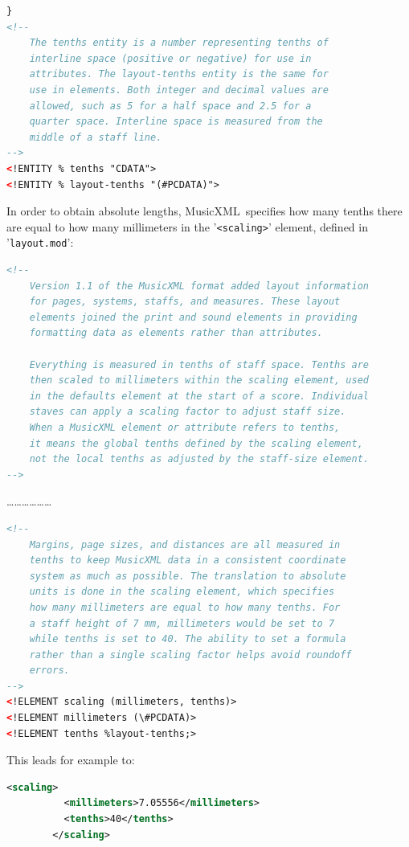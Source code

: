 \documentclass[12pt,a4paper]{article}
\newcommand{\mxml}{MusicXML}
\begin{document}
\begin{lstlisting}[language=XML]
}
<!--
	The tenths entity is a number representing tenths of
	interline space (positive or negative) for use in
	attributes. The layout-tenths entity is the same for
	use in elements. Both integer and decimal values are 
	allowed, such as 5 for a half space and 2.5 for a 
	quarter space. Interline space is measured from the
	middle of a staff line.
-->
<!ENTITY % tenths "CDATA">
<!ENTITY % layout-tenths "(#PCDATA)">
\end{lstlisting}

In order to obtain absolute lengths, \mxml\ specifies how many tenths there are equal to how many millimeters in the {'\tt <scaling>}' element, defined in {'\tt layout.mod}':

\begin{lstlisting}[language=XML]
<!--
	Version 1.1 of the MusicXML format added layout information
	for pages, systems, staffs, and measures. These layout
	elements joined the print and sound elements in providing
	formatting data as elements rather than attributes.

	Everything is measured in tenths of staff space. Tenths are
	then scaled to millimeters within the scaling element, used
	in the defaults element at the start of a score. Individual
	staves can apply a scaling factor to adjust staff size.
	When a MusicXML element or attribute refers to tenths,
	it means the global tenths defined by the scaling element,
	not the local tenths as adjusted by the staff-size element.
-->
\end{lstlisting}
\dots \dots \dots \dots \dots \dots
\begin{lstlisting}[language=XML]
<!--
	Margins, page sizes, and distances are all measured in
	tenths to keep MusicXML data in a consistent coordinate
	system as much as possible. The translation to absolute
	units is done in the scaling element, which specifies
	how many millimeters are equal to how many tenths. For
	a staff height of 7 mm, millimeters would be set to 7
	while tenths is set to 40. The ability to set a formula
	rather than a single scaling factor helps avoid roundoff
	errors.
-->
<!ELEMENT scaling (millimeters, tenths)>
<!ELEMENT millimeters (\#PCDATA)>
<!ELEMENT tenths %layout-tenths;>
\end{lstlisting}

This leads for example to:
\begin{lstlisting}[language=XML, caption=Scaling example]
        <scaling>
          <millimeters>7.05556</millimeters>
          <tenths>40</tenths>
        </scaling>
\end{lstlisting}
\end{document}
